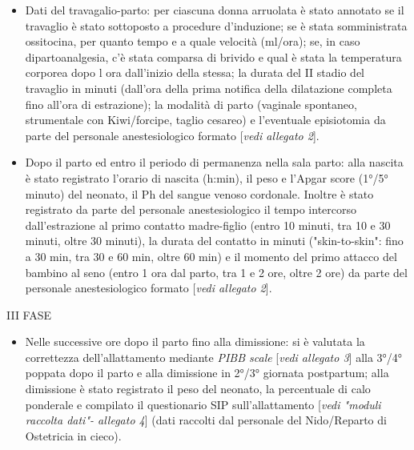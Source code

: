 \documentclass[]{article}
\begin{document}
\begin{itemize}
\begin{quote}
  {Raccolta dei dati materni:} per ciascuna donna arruolata sono stati
  registrati età, peso prima e a termine della gravidanza, altezza, Body
  Mass Index, livello di istruzione scolastica, professione,
  nazionalità, residenza, da quanto tempo era residente in Italia se
  immigrata da parte del personale anestesiologico formato{[}\emph{vedi
  allegato 2}{]};
  \end{quote}
\item
  {Dati del travagalio-parto:} per ciascuna donna arruolata è stato
  annotato se il travaglio è stato sottoposto a procedure d'induzione;
  se è stata somministrata ossitocina, per quanto tempo e a quale
  velocità (ml/ora); se, in caso dipartoanalgesia, c'è stata comparsa di
  brivido e qual è stata la temperatura corporea dopo l ora dall'inizio
  della stessa; la durata del II stadio del travaglio in minuti
  (dall'ora della prima notifica della dilatazione completa fino all'ora
  di estrazione); la modalità di parto (vaginale spontaneo, strumentale
  con Kiwi/forcipe, taglio cesareo) e l'eventuale episiotomia da parte
  del personale anestesiologico formato {[}\emph{vedi allegato 2}{]}.
\item
  {Dopo il parto ed entro il periodo di permanenza nella sala parto}:
  alla nascita è stato registrato l'orario di nascita (h:min), il peso e
  l'Apgar score (1°/5° minuto) del neonato, il Ph del sangue venoso
  cordonale. Inoltre è stato registrato da parte del personale
  anestesiologico il tempo intercorso dall'estrazione al primo contatto
  madre-figlio (entro 10 minuti, tra 10 e 30 minuti, oltre 30 minuti),
  la durata del contatto in minuti ("skin-to-skin": fino a 30 min, tra
  30 e 60 min, oltre 60 min) e il momento del primo attacco del bambino
  al seno (entro 1 ora dal parto, tra 1 e 2 ore, oltre 2 ore) da parte
  del personale anestesiologico formato {[}\emph{vedi allegato 2}{]}.
\end{itemize}

{III FASE}

\begin{itemize}
\item
  {Nelle successive ore dopo il parto fino alla dimissione}: si è
  valutata la correttezza dell'allattamento mediante \emph{PIBB scale}
  {[}\emph{vedi allegato 3}{]} alla 3°/4° poppata dopo il parto e alla
  dimissione in 2°/3° giornata postpartum; alla dimissione è stato
  registrato il peso del neonato, la percentuale di calo ponderale e
  compilato il questionario SIP sull'allattamento {[}\emph{vedi "moduli
  raccolta dati"- allegato 4}{]} (dati raccolti dal personale del
  Nido/Reparto di Ostetricia in cieco).
\end{itemize}
\end{document}
